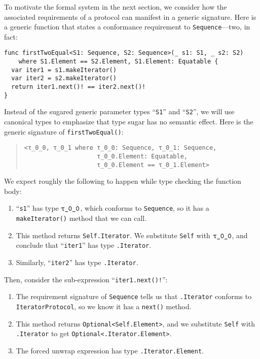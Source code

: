 \documentclass[../generics]{subfiles}
\begin{document}
\begin{example}\label{motivating derived reqs}
To motivate the formal system in the next section, we consider how the associated requirements of a protocol can manifest in a generic signature. Here is a generic function that states a conformance requirement to \texttt{Sequence}---two, in fact:
\begin{Verbatim}
func firstTwoEqual<S1: Sequence, S2: Sequence>(_ s1: S1, _ s2: S2)
    where S1.Element == S2.Element, S1.Element: Equatable {
  var iter1 = s1.makeIterator()
  var iter2 = s2.makeIterator()
  return iter1.next()! == iter2.next()!
}
\end{Verbatim}
Instead of the sugared generic parameter types ``\texttt{S1}'' and ``\texttt{S2}'', we will use canonical types to emphasize that type sugar has no semantic effect. Here is the generic signature of \texttt{firstTwoEqual()}:
\begin{quote}
\begin{verbatim}
<τ_0_0, τ_0_1 where τ_0_0: Sequence, τ_0_1: Sequence,
                    τ_0_0.Element: Equatable,
                    τ_0_0.Element == τ_0_1.Element>
\end{verbatim}
\end{quote}
We expect roughly the following to happen while type checking the function body:
\begin{enumerate}
\item ``\texttt{s1}'' has type $\texttt{$\uptau$\_0\_0}$, which conforms to \texttt{Sequence}, so it has a \texttt{makeIterator()} method that we can call.
\item This method returns \texttt{Self.Iterator}. We substitute \texttt{Self} with $\texttt{$\uptau$\_0\_0}$, and conclude that ``\texttt{iter1}'' has type \texttt{\rT.Iterator}.
\item Similarly, ``\texttt{iter2}'' has type \texttt{\rU.Iterator}.
\end{enumerate}
Then, consider the sub-expression ``\verb|iter1.next()!|'':
\begin{enumerate}
\item The requirement signature of \texttt{Sequence} tells us that \texttt{\rT.Iterator} conforms to \texttt{IteratorProtocol}, so we know it has a \texttt{next()} method.
\item This method returns \texttt{Optional<Self.Element>}, and we substitute \texttt{Self} with \texttt{\rT.Iterator} to get \texttt{Optional<\rT.Iterator.Element>}.
\item The forced unwrap expression has type \texttt{\rT.Iterator.Element}. 

\end{enumerate}
\end{example}
\end{document}
